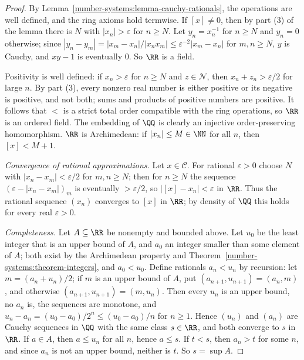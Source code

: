 \begin{proof}
By Lemma~\ref{number-systems:lemma-cauchy-rationals}, the operations are well
defined, and the ring axioms hold termwise. If $[x] \neq 0$, then by part (3)
of the lemma there is $N$ with $|x_n| > \varepsilon$ for $n \geq N$. Let
$y_n = x_n^{-1}$ for $n \geq N$ and $y_n = 0$ otherwise; since
$|y_n - y_m| = |x_m - x_n|/|x_n x_m| \leq \varepsilon^{-2}|x_m - x_n|$ for
$m, n \geq N$, $y$ is Cauchy, and $xy - 1$ is eventually $0$. So $\RR$ is a field.

Positivity is well defined: if $x_n > \varepsilon$ for $n \geq N$ and
$z \in \mathcal{N}$, then $x_n + z_n > \varepsilon/2$ for large $n$. By part (3),
every nonzero real number is either positive or its negative is positive, and
not both; sums and products of positive numbers are positive. It follows that
$<$ is a strict total order compatible with the ring operations, so $\RR$ is an
ordered field. The embedding of $\QQ$ is clearly an injective order-preserving
homomorphism. $\RR$ is Archimedean: if $|x_n| \leq M \in \NN$ for all $n$, then
$[x] < M + 1$.

\emph{Convergence of rational approximations.} Let $x \in \mathcal{C}$. For
rational $\varepsilon > 0$ choose $N$ with $|x_n - x_m| < \varepsilon/2$ for
$m, n \geq N$; then for $n \geq N$ the sequence $(\varepsilon - |x_n - x_m|)_m$ is
eventually $> \varepsilon/2$, so $|[x] - x_n| < \varepsilon$ in $\RR$. Thus the
rational sequence $(x_n)$ converges to $[x]$ in $\RR$; by density of $\QQ$ this
holds for every real $\varepsilon > 0$.

\emph{Completeness.} Let $A \subseteq \RR$ be nonempty and bounded above. Let
$u_0$ be the least integer that is an upper bound of $A$, and $a_0$ an integer
smaller than some element of $A$; both exist by the Archimedean property and
Theorem~\ref{number-systems:theorem-integers}, and $a_0 < u_0$. Define rationals $a_n < u_n$ by
recursion: let $m = (a_n + u_n)/2$; if $m$ is an upper bound of $A$, put
$(a_{n+1}, u_{n+1}) = (a_n, m)$, and otherwise $(a_{n+1}, u_{n+1}) = (m, u_n)$.
Then every $u_n$ is an upper bound, no $a_n$ is, the sequences are monotone, and
$u_n - a_n = (u_0 - a_0)/2^n \leq (u_0 - a_0)/n$ for $n \geq 1$. Hence $(u_n)$ and
$(a_n)$ are Cauchy sequences in $\QQ$ with the same class $s \in \RR$, and both
converge to $s$ in $\RR$. If $a \in A$, then $a \leq u_n$ for all $n$, hence
$a \leq s$. If $t < s$, then $a_n > t$ for some $n$, and since $a_n$ is not an upper
bound, neither is $t$. So $s = \sup A$.
\end{proof}

